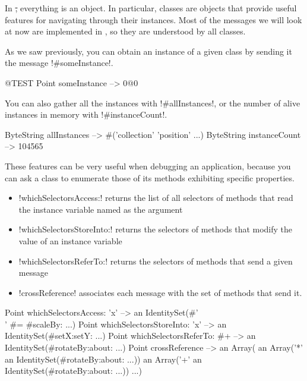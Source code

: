 \documentclass[a4paper,10pt,twoside]{book}
\begin{document}
In \st, everything is an object. In particular, classes are objects that provide useful features for navigating through their instances.
Most of the messages we will look at now are implemented in , so they are understood by all classes.

As we saw previously, you can obtain an instance of a given class by sending it the message \ct!#someInstance!.

\begin{code}{@TEST} %
Point someInstance --> 0@0
\end{code}

You can also gather all the instances with \ct!#allInstances!, or the number of alive instances in memory with \ct!#instanceCount!. 

\begin{code}{} %
ByteString allInstances     --> #('collection' 'position'  ...)
ByteString instanceCount --> 104565
\end{code}

These features can be very useful when debugging an application, because you can ask a class to enumerate those of its methods exhibiting specific properties.
\begin{itemize}
\item \ct!whichSelectorsAccess:! returns the list of all selectors of methods that read  the instance variable named as the argument 
\item \ct!whichSelectorsStoreInto:! returns the selectors of methods that modify the value of an instance variable
\item \ct!whichSelectorsReferTo:! returns the selectors of methods that send a given message
\item \ct!crossReference! associates each message with the set of methods that send it.
\end{itemize}

\begin{code}{} %
Point whichSelectorsAccess: 'x'    --> an IdentitySet(#'\\' #= #scaleBy: ...)
Point whichSelectorsStoreInto: 'x' --> an IdentitySet(#setX:setY: ...)
Point whichSelectorsReferTo: #+  --> an IdentitySet(#rotateBy:about: ...)
Point crossReference --> an Array(
		an Array('*' an IdentitySet(#rotateBy:about: ...))
		an Array('+' an IdentitySet(#rotateBy:about: ...))
		...)
\end{code}
\end{document}
